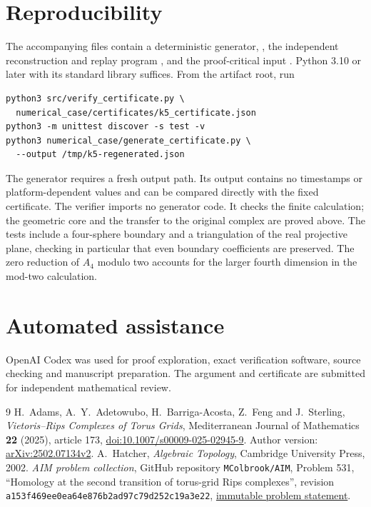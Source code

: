 \documentclass[11pt]{amsart}
\begin{document}
\section*{Reproducibility}
The accompanying files contain a deterministic generator,
, the independent reconstruction and
replay program , and the proof-critical
input .
Python 3.10 or later with its standard library suffices. From the artifact
root, run
\begin{verbatim}
python3 src/verify_certificate.py \
  numerical_case/certificates/k5_certificate.json
python3 -m unittest discover -s test -v
python3 numerical_case/generate_certificate.py \
  --output /tmp/k5-regenerated.json
\end{verbatim}
The generator requires a fresh output path. Its output contains no
timestamps or platform-dependent values and can be compared directly with
the fixed certificate. The verifier imports no generator code. It checks
the finite calculation; the geometric core and the transfer to the original
complex are proved above. The tests include a four-sphere boundary and a
triangulation of the real projective plane, checking in particular that even
boundary coefficients are preserved. The zero reduction of $A_4$ modulo
two accounts for the larger fourth dimension in the mod-two calculation.

\section*{Automated assistance}
OpenAI Codex was used for proof exploration, exact verification software,
source checking and manuscript preparation. The argument and certificate
are submitted for independent mathematical review.

\begin{thebibliography}{9}
H.~Adams, A.~Y.~Adetowubo, H.~Barriga-Acosta, Z.~Feng and J.~Sterling,
\emph{Vietoris--Rips Complexes of Torus Grids},
Mediterranean Journal of Mathematics \textbf{22} (2025), article 173,
\href{https://doi.org/10.1007/s00009-025-02945-9}{doi:10.1007/s00009-025-02945-9}.
Author version: \href{https://arxiv.org/abs/2502.07134v2}{arXiv:2502.07134v2}.
\bibitem{hatcher}
A.~Hatcher, \emph{Algebraic Topology}, Cambridge University Press, 2002.
\bibitem{aim}
\emph{AIM problem collection}, GitHub repository \texttt{MColbrook/AIM}, Problem 531,
``Homology at the second transition of torus-grid Rips complexes'',
revision \texttt{a153f469ee0ea64e876b2ad97c79d252c19a3e22},
\href{https://github.com/MColbrook/AIM/blob/a153f469ee0ea64e876b2ad97c79d252c19a3e22/problems/531-torus-grid-transition-homology.md}{immutable problem statement}.
\end{thebibliography}
\end{document}
